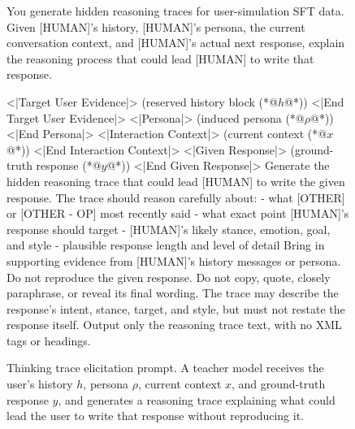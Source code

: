 \begin{figure}[t]
\centering
\begin{promptbox}
You generate hidden reasoning traces for user-simulation SFT data.
Given [HUMAN]'s history, [HUMAN]'s persona, the current
conversation context, and [HUMAN]'s actual next response,
explain the reasoning process that could lead [HUMAN]
to write that response.
\end{promptbox}

\vspace{15pt}

\begin{promptbox}
<|Target User Evidence|>
(reserved history block (*@$h$@*))
<|End Target User Evidence|>
<|Persona|>
(induced persona (*@$\rho$@*))
<|End Persona|>
<|Interaction Context|>
(current context (*@$x$@*))
<|End Interaction Context|>
<|Given Response|>
(ground-truth response (*@$y$@*))
<|End Given Response|>
Generate the hidden reasoning trace that could lead
[HUMAN] to write the given response.
The trace should reason carefully about:
- what [OTHER] or [OTHER - OP] most recently said
- what exact point [HUMAN]'s response should target
- [HUMAN]'s likely stance, emotion, goal, and style
- plausible response length and level of detail
Bring in supporting evidence from [HUMAN]'s history messages or persona.
Do not reproduce the given response. Do not copy, quote, closely paraphrase, or reveal its final wording. The trace may describe the response's intent, stance, target, and style, but must not restate the response itself.
Output only the reasoning trace text, with no XML tags or headings.
\end{promptbox}
\caption{
Thinking trace elicitation prompt. A teacher model receives the user's history $h$, persona $\rho$,
current context $x$, and ground-truth response $y$, and generates
a reasoning trace explaining what could lead the user to write
that response without reproducing it.
}
\label{fig:thinking_trace_prompt}
\end{figure}
